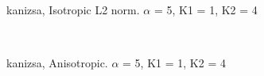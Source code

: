 \begin{figure}
  \centering
     \\
  \caption{kanizsa, Isotropic L2 norm. $\alpha$ = 5, K1 = 1, K2 = 4}
  \label{fig:kanizsa_L2_a5_k11_k24}
\end{figure}

\begin{figure}
  \centering
     \\
  \caption{kanizsa, Anisotropic. $\alpha$ = 5, K1 = 1, K2 = 4}
  \label{fig:kanizsa_L2_a5_k11_k24}
\end{figure}